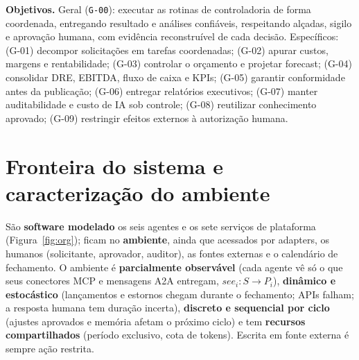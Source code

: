 \documentclass[10pt,a4paper]{article}
\newcommand{\code}[1]{\texttt{#1}}
\begin{document}
\textbf{Objetivos.} Geral (\code{G-00}): executar as rotinas de controladoria de forma coordenada, entregando
resultado e análises confiáveis, respeitando alçadas, sigilo e aprovação humana, com evidência reconstruível de cada
decisão. Específicos: (G-01) decompor solicitações em tarefas coordenadas; (G-02) apurar custos, margens e
rentabilidade; (G-03) controlar o orçamento e projetar forecast; (G-04) consolidar DRE, EBITDA, fluxo de caixa e
KPIs; (G-05) garantir conformidade antes da publicação; (G-06) entregar relatórios executivos; (G-07) manter
auditabilidade e custo de IA sob controle; (G-08) reutilizar conhecimento aprovado; (G-09) restringir efeitos
externos à autorização humana.

\section{Fronteira do sistema e caracterização do ambiente}
São \textbf{software modelado} os seis agentes e os sete serviços de plataforma (Figura~\ref{fig:org}); ficam no
\textbf{ambiente}, ainda que acessados por adapters, os humanos (solicitante, aprovador, auditor), as fontes externas
e o calendário de fechamento. O ambiente é \textbf{parcialmente observável} (cada agente vê só o que seus conectores
MCP e mensagens A2A entregam, $see_i: S\to P_i$), \textbf{dinâmico e estocástico} (lançamentos e estornos chegam
durante o fechamento; APIs falham; a resposta humana tem duração incerta), \textbf{discreto e sequencial por ciclo}
(ajustes aprovados e memória afetam o próximo ciclo) e tem \textbf{recursos compartilhados} (período exclusivo,
cota de tokens). Escrita em fonte externa é sempre ação restrita.
\end{document}
